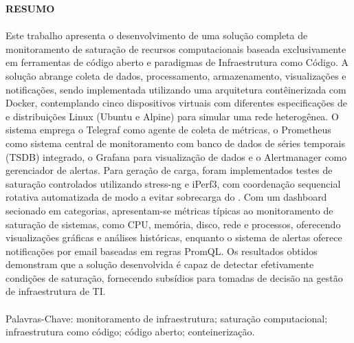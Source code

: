 \begin{center}
\textbf{RESUMO}
\end{center}
\vspace{0.5cm}

\paragraph{}

Este trabalho apresenta o desenvolvimento de uma solução completa de monitoramento de saturação de recursos computacionais baseada exclusivamente em ferramentas de código aberto e paradigmas de Infraestrutura como Código. A solução abrange coleta de dados, processamento, armazenamento, visualizações e notificações, sendo implementada utilizando uma arquitetura contêinerizada com Docker, contemplando cinco dispositivos virtuais com diferentes especificações de  e distribuições Linux (Ubuntu e Alpine) para simular uma rede heterogênea. O sistema emprega o Telegraf como agente de coleta de métricas, o Prometheus como sistema central de monitoramento com banco de dados de séries temporais (TSDB) integrado, o Grafana para visualização de dados e o Alertmanager como gerenciador de alertas. Para geração de carga, foram implementados testes de saturação controlados utilizando stress-ng e iPerf3, com coordenação sequencial rotativa automatizada de modo a evitar sobrecarga do . Com um dashboard secionado em categorias, apresentam-se métricas típicas ao monitoramento de saturação de sistemas, como CPU, memória, disco, rede e processos, oferecendo visualizações gráficas e análises históricas, enquanto o sistema de alertas oferece notificações por email baseadas em regras PromQL. Os resultados obtidos demonstram que a solução desenvolvida é capaz de detectar efetivamente condições de saturação, fornecendo subsídios para tomadas de decisão na gestão de infraestrutura de TI.

\paragraph{}
\noindent Palavras-Chave: monitoramento de infraestrutura; saturação computacional; infraestrutura como código; código aberto; conteinerização.

\pagebreak
